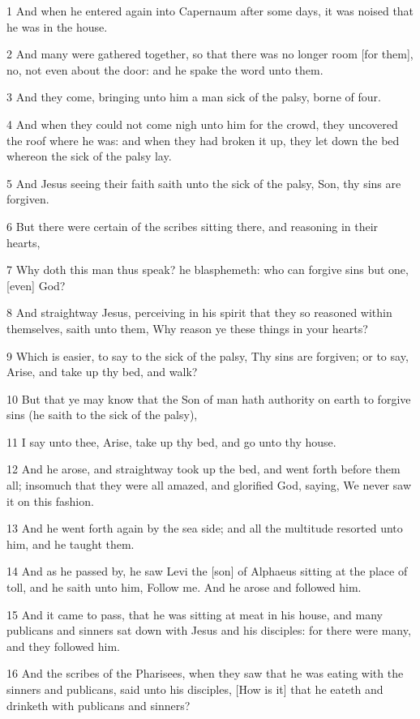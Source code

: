 \par 1 And when he entered again into Capernaum after some days, it was noised that he was in the house.
\par 2 And many were gathered together, so that there was no longer room [for them], no, not even about the door: and he spake the word unto them.
\par 3 And they come, bringing unto him a man sick of the palsy, borne of four.
\par 4 And when they could not come nigh unto him for the crowd, they uncovered the roof where he was: and when they had broken it up, they let down the bed whereon the sick of the palsy lay.
\par 5 And Jesus seeing their faith saith unto the sick of the palsy, Son, thy sins are forgiven.
\par 6 But there were certain of the scribes sitting there, and reasoning in their hearts,
\par 7 Why doth this man thus speak? he blasphemeth: who can forgive sins but one, [even] God?
\par 8 And straightway Jesus, perceiving in his spirit that they so reasoned within themselves, saith unto them, Why reason ye these things in your hearts?
\par 9 Which is easier, to say to the sick of the palsy, Thy sins are forgiven; or to say, Arise, and take up thy bed, and walk?
\par 10 But that ye may know that the Son of man hath authority on earth to forgive sins (he saith to the sick of the palsy),
\par 11 I say unto thee, Arise, take up thy bed, and go unto thy house.
\par 12 And he arose, and straightway took up the bed, and went forth before them all; insomuch that they were all amazed, and glorified God, saying, We never saw it on this fashion.
\par 13 And he went forth again by the sea side; and all the multitude resorted unto him, and he taught them.
\par 14 And as he passed by, he saw Levi the [son] of Alphaeus sitting at the place of toll, and he saith unto him, Follow me. And he arose and followed him.
\par 15 And it came to pass, that he was sitting at meat in his house, and many publicans and sinners sat down with Jesus and his disciples: for there were many, and they followed him.
\par 16 And the scribes of the Pharisees, when they saw that he was eating with the sinners and publicans, said unto his disciples, [How is it] that he eateth and drinketh with publicans and sinners?

